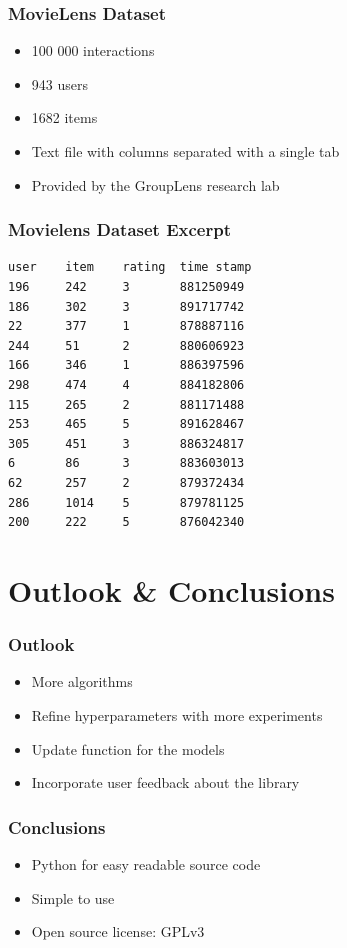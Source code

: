 \documentclass[mathserif,svgnames]{beamer}
\begin{document}
\begin{frame}
    \frametitle{MovieLens Dataset}
    \begin{itemize}
        \item 100 000 interactions
        \item 943 users
        \item 1682 items
        \item Text file with columns separated with a single tab
        \item Provided by the GroupLens research lab
    \end{itemize}
\end{frame}
\begin{frame}[fragile]
    \frametitle{Movielens Dataset Excerpt}
\begin{lstlisting}
user    item    rating  time stamp
196     242     3       881250949
186     302     3       891717742
22      377     1       878887116
244     51      2       880606923
166     346     1       886397596
298     474     4       884182806
115     265     2       881171488
253     465     5       891628467
305     451     3       886324817
6       86      3       883603013
62      257     2       879372434
286     1014    5       879781125
200     222     5       876042340
\end{lstlisting}
\end{frame}

\section{Outlook \& Conclusions}
\begin{frame}
\frametitle{Outlook}\pause
\begin{itemize}
	\item More algorithms\pause
	\item Refine hyperparameters with more experiments\pause
	\item Update function for the models\pause
	\item Incorporate user feedback about the library
\end{itemize}
\end{frame}

\begin{frame} 
\frametitle{Conclusions} 
\begin{itemize}
    \item Python for easy readable source code \visible<2->{$\checkmark$}
    \item Simple to use 
    \item Open source license: GPLv3 
\end{itemize}
\end{frame}
\end{document}
